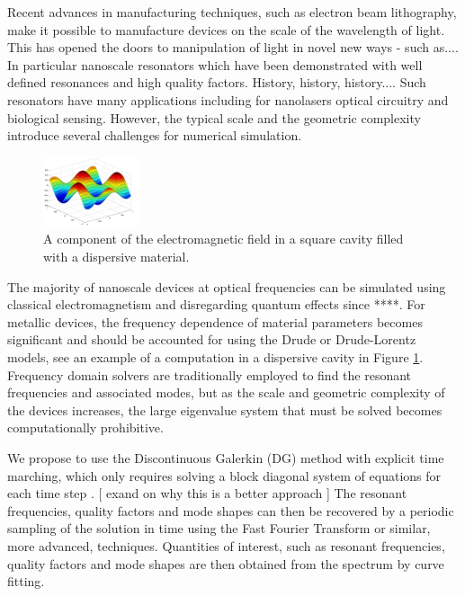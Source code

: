 \documentclass[times,11pt]{ACME2015article}
\begin{document}
\begin{normalsize}
Recent advances in manufacturing techniques, such as electron beam lithography, make it possible to manufacture devices on the scale of the wavelength of light. This has opened the doors to manipulation of light in novel new ways - such as....  In particular nanoscale resonators which have been demonstrated with well defined resonances and high quality factors. History, history, history.... Such resonators have many applications including for nanolasers optical circuitry and biological sensing. However, the typical scale and the geometric complexity introduce several challenges for numerical simulation.

\begin{figure}
 \centering
 \includegraphics[width=0.25\textwidth]{DispersiveCavityPlot}
 \caption{A component of the electromagnetic field in a square cavity filled with a dispersive material.}
 \label{MicroToroidalSensor:graph}
\end{figure}

The majority of nanoscale devices at optical frequencies can be simulated using classical electromagnetism and disregarding quantum effects since ****. For metallic devices, the frequency dependence of material parameters becomes significant and should be accounted for using the Drude or Drude-Lorentz models, see an example of a computation in a dispersive cavity in Figure \ref{MicroToroidalSensor:graph}. Frequency domain solvers \cite{ref1} are traditionally employed to find the resonant frequencies and associated modes, but as the scale and geometric complexity of the devices increases, the large eigenvalue system that must be solved becomes computationally prohibitive.

We propose to use the Discontinuous Galerkin (DG) method with explicit time marching, which only requires solving a block diagonal system of equations for each time step \cite{ref2}. [ exand on why this is a better approach ] The resonant frequencies, quality factors and mode shapes can then be recovered by a periodic sampling of the solution in time using the Fast Fourier Transform or similar, more advanced, techniques. Quantities of interest, such as resonant frequencies, quality factors and mode shapes are then obtained from the spectrum by curve fitting.


\end{normalsize}
\end{document}
